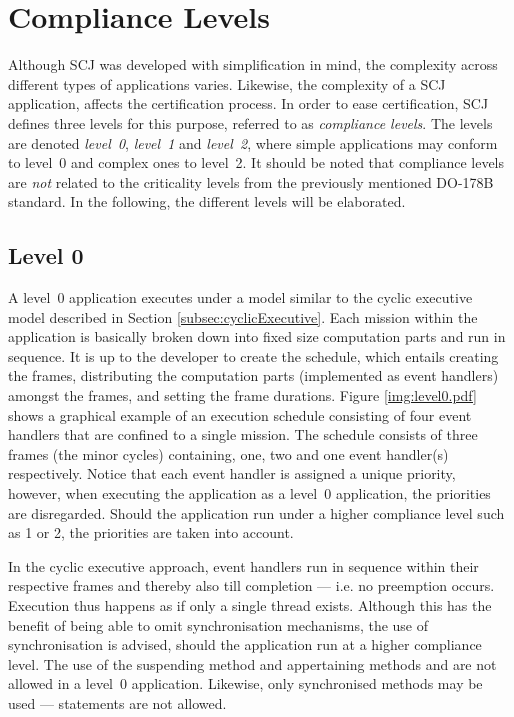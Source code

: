 \section{Compliance Levels}
\label{section:complianceLevels}
Although SCJ was developed with simplification in mind, the complexity across different types of applications varies. Likewise, the complexity of a SCJ application, affects the certification process. In order to ease certification, SCJ defines three levels for this purpose, referred to as \textit{compliance levels}. The levels are denoted \textit{level~0}, \textit{level~1} and \textit{level~2}, where simple applications may conform to level~0 and complex ones to level~2. It should be noted that compliance levels are \textit{not} related to the criticality levels from the previously mentioned DO-178B standard. In the following, the different levels will be elaborated.

\subsection{Level 0}
A level~0 application executes under a model similar to the cyclic executive model described in Section \ref{subsec:cyclicExecutive}. Each mission within the application is basically broken down into fixed size computation parts and run in sequence. It is up to the developer to create the schedule, which entails creating the frames, distributing the computation parts (implemented as event handlers) amongst the frames, and setting the frame durations. Figure \ref{img:level0.pdf} shows a graphical example of an execution schedule consisting of four event handlers that are confined to a single mission. The schedule consists of three frames (the minor cycles) containing, one, two and one event handler(s) respectively. Notice that each event handler is assigned a unique priority, however, when executing the application as a level~0 application, the priorities are disregarded. Should the application run under a higher compliance level such as 1 or 2, the priorities are taken into account.


In the cyclic executive approach, event handlers run in sequence within their respective frames and thereby also till completion --- i.e. no preemption occurs. Execution thus happens as if only a single thread exists. Although this has the benefit of being able to omit synchronisation mechanisms, the use of synchronisation is advised, should the application run at a higher compliance level. The use of the suspending method  and appertaining methods  and  are not allowed in a level~0 application. Likewise, only synchronised methods may be used ---  statements are not allowed.

